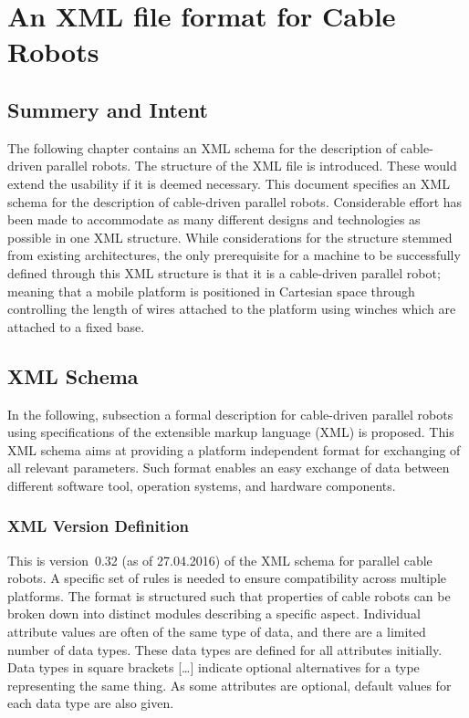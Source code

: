 
\chapter{An XML file format for Cable Robots}\label{sec:XmlFileFormat}
\section{Summery and Intent}
The following chapter contains an XML schema for the description of
cable-driven parallel robots. The structure of the XML file is introduced.
These would extend the usability if it is deemed necessary. This document
specifies an XML schema for the description of cable-driven parallel robots.
Considerable effort has been made to accommodate as many different designs and
technologies as possible in one XML structure. While considerations for the
structure stemmed from existing architectures, the only prerequisite for a
machine to be successfully defined through this XML structure is that it is a
cable-driven parallel robot; meaning that a mobile platform is positioned in
Cartesian space through controlling the length of wires attached to the
platform using winches which are attached to a fixed base.

\section{XML Schema}\label{sec:XmlFormatSpecs}
In the following, subsection a formal description for cable-driven parallel
robots using specifications of the extensible markup language (XML) is
proposed. This XML schema aims at providing a platform independent format for
exchanging of all relevant parameters. Such format enables an easy exchange of
data between different software tool, operation systems, and hardware
components.

\subsection{XML Version Definition}%
This is version~0.32 (as of 27.04.2016) of the XML schema for parallel cable
robots. A specific set of rules is needed to ensure compatibility across
multiple platforms. The format is structured such that properties of cable
robots can be broken down into distinct modules describing a specific aspect.
Individual attribute values are often of the same type of data, and there are a
limited number of data types. These data types are defined for all attributes
initially. Data types in square brackets [\ldots] indicate optional
alternatives for a type representing the same thing.  As some attributes are
optional, default values for each data type are also given.


